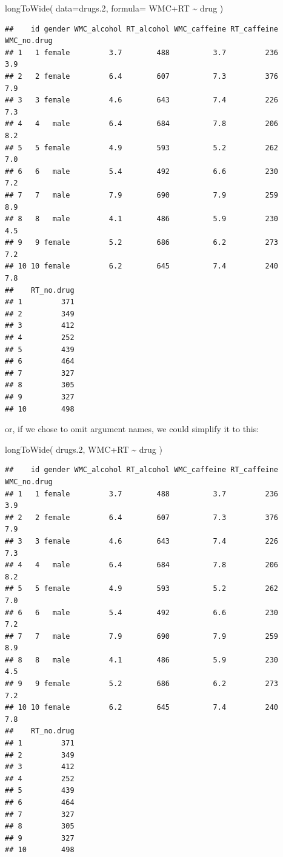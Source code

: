 \documentclass[
]{book}
\newenvironment{Shaded}{\begin{snugshade}}{\end{snugshade}}
\newcommand{\AttributeTok}[1]{\textcolor[rgb]{0.77,0.63,0.00}{#1}}
\newcommand{\FloatTok}[1]{\textcolor[rgb]{0.00,0.00,0.81}{#1}}
\newcommand{\FunctionTok}[1]{\textcolor[rgb]{0.00,0.00,0.00}{#1}}
\newcommand{\NormalTok}[1]{#1}
\newcommand{\SpecialCharTok}[1]{\textcolor[rgb]{0.00,0.00,0.00}{#1}}
\begin{document}
\begin{Shaded}
\begin{Highlighting}[]
\FunctionTok{longToWide}\NormalTok{( }\AttributeTok{data=}\NormalTok{drugs}\FloatTok{.2}\NormalTok{, }\AttributeTok{formula=}\NormalTok{ WMC}\SpecialCharTok{+}\NormalTok{RT }\SpecialCharTok{\textasciitilde{}}\NormalTok{ drug )}
\end{Highlighting}
\end{Shaded}

\begin{verbatim}
##    id gender WMC_alcohol RT_alcohol WMC_caffeine RT_caffeine WMC_no.drug
## 1   1 female         3.7        488          3.7         236         3.9
## 2   2 female         6.4        607          7.3         376         7.9
## 3   3 female         4.6        643          7.4         226         7.3
## 4   4   male         6.4        684          7.8         206         8.2
## 5   5 female         4.9        593          5.2         262         7.0
## 6   6   male         5.4        492          6.6         230         7.2
## 7   7   male         7.9        690          7.9         259         8.9
## 8   8   male         4.1        486          5.9         230         4.5
## 9   9 female         5.2        686          6.2         273         7.2
## 10 10 female         6.2        645          7.4         240         7.8
##    RT_no.drug
## 1         371
## 2         349
## 3         412
## 4         252
## 5         439
## 6         464
## 7         327
## 8         305
## 9         327
## 10        498
\end{verbatim}

or, if we chose to omit argument names, we could simplify it to this:

\begin{Shaded}
\begin{Highlighting}[]
\FunctionTok{longToWide}\NormalTok{( drugs}\FloatTok{.2}\NormalTok{, WMC}\SpecialCharTok{+}\NormalTok{RT }\SpecialCharTok{\textasciitilde{}}\NormalTok{ drug )}
\end{Highlighting}
\end{Shaded}

\begin{verbatim}
##    id gender WMC_alcohol RT_alcohol WMC_caffeine RT_caffeine WMC_no.drug
## 1   1 female         3.7        488          3.7         236         3.9
## 2   2 female         6.4        607          7.3         376         7.9
## 3   3 female         4.6        643          7.4         226         7.3
## 4   4   male         6.4        684          7.8         206         8.2
## 5   5 female         4.9        593          5.2         262         7.0
## 6   6   male         5.4        492          6.6         230         7.2
## 7   7   male         7.9        690          7.9         259         8.9
## 8   8   male         4.1        486          5.9         230         4.5
## 9   9 female         5.2        686          6.2         273         7.2
## 10 10 female         6.2        645          7.4         240         7.8
##    RT_no.drug
## 1         371
## 2         349
## 3         412
## 4         252
## 5         439
## 6         464
## 7         327
## 8         305
## 9         327
## 10        498
\end{verbatim}
\end{document}
